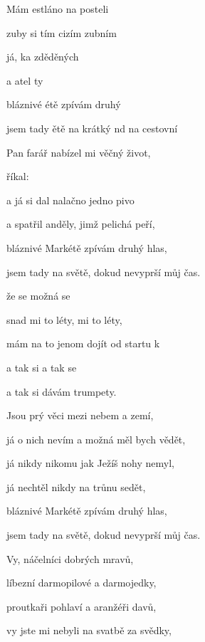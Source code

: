 

\zs
Mám estláno na posteli 

zuby si tím cizím zubním 

já, ka zděděných 

a atel ty 

bláznivé étě zpívám druhý 

jsem tady ětě na krátký nd na cestovní  
  
\ks

\zs
Pan farář nabízel mi věčný život,

říkal: 

a já si dal nalačno jedno pivo

a spatřil anděly, jimž pelichá peří,

bláznivé Markétě zpívám druhý hlas,

jsem tady na světě, dokud nevyprší můj čas.
\ks

\zr
{} že se  možná se 

snad mi to  léty,  mi to  léty,

mám na to jenom  dojít od startu k 

a tak si  a tak se 

a tak si dávám  trumpety.   
\kr

\zs
Jsou prý věci mezi nebem a zemí,

já o nich nevím a možná měl bych vědět,

já nikdy nikomu jak Ježíš nohy nemyl,

já nechtěl nikdy na trůnu sedět,

bláznivé Markétě zpívám druhý hlas,

jsem tady na světě, dokud nevyprší můj čas.
\ks

\zs
Vy, náčelníci dobrých mravů,

líbezní darmopilové a darmojedky,

proutkaři pohlaví a aranžéři davů,

vy jste mi nebyli na svatbě za svědky,

